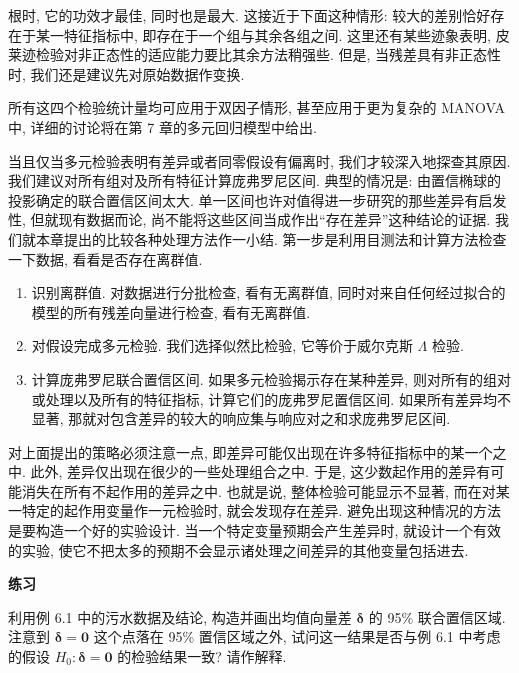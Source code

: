 
根时, 它的功效才最佳, 同时也是最大. 这接近于下面这种情形: 较大的差别恰好存在于某一特征指标中, 即存在于一个组与其余各组之间. 这里还有某些迹象表明, 皮莱迹检验对非正态性的适应能力要比其余方法稍强些. 但是, 当残差具有非正态性时, 我们还是建议先对原始数据作变换.

所有这四个检验统计量均可应用于双因子情形, 甚至应用于更为复杂的 MANOVA 中, 详细的讨论将在第 7 章的多元回归模型中给出.

当且仅当多元检验表明有差异或者同零假设有偏离时, 我们才较深入地探查其原因. 我们建议对所有组对及所有特征计算庞弗罗尼区间. 典型的情况是: 由置信椭球的投影确定的联合置信区间太大. 单一区间也许对值得进一步研究的那些差异有启发性, 但就现有数据而论, 尚不能将这些区间当成作出“存在差异”这种结论的证据. 我们就本章提出的比较各种处理方法作一小结. 第一步是利用目测法和计算方法检查一下数据, 看看是否存在离群值.

\begin{mvframe}[对各种处理进行多元比较的策略]
\begin{enumerate}
\item 识别离群值. 对数据进行分批检查, 看有无离群值, 同时对来自任何经过拟合的模型的所有残差向量进行检查, 看有无离群值.
\item 对假设完成多元检验. 我们选择似然比检验, 它等价于威尔克斯 $\Lambda$ 检验.
\item 计算庞弗罗尼联合置信区间. 如果多元检验揭示存在某种差异, 则对所有的组对或处理以及所有的特征指标, 计算它们的庞弗罗尼置信区间. 如果所有差异均不显著, 那就对包含差异的较大的响应集与响应对之和求庞弗罗尼区间.
\end{enumerate}
\end{mvframe}

对上面提出的策略必须注意一点, 即差异可能仅出现在许多特征指标中的某一个之中. 此外, 差异仅出现在很少的一些处理组合之中. 于是, 这少数起作用的差异有可能消失在所有不起作用的差异之中. 也就是说, 整体检验可能显示不显著, 而在对某一特定的起作用变量作一元检验时, 就会发现存在差异. 避免出现这种情况的方法是要构造一个好的实验设计. 当一个特定变量预期会产生差异时, 就设计一个有效的实验, 使它不把太多的预期不会显示诸处理之间差异的其他变量包括进去.

\vspace{6pt}
{\large\bfseries 练习}

\medskip
{}\quad 利用例 6.1 中的污水数据及结论, 构造并画出均值向量差 $\boldsymbol{\delta}$ 的 95\% 联合置信区域. 注意到 $\boldsymbol{\delta}=\mathbf{0}$ 这个点落在 95\% 置信区域之外, 试问这一结果是否与例 6.1 中考虑的假设 $H_0: \boldsymbol{\delta}=\mathbf{0}$ 的检验结果一致? 请作解释.

